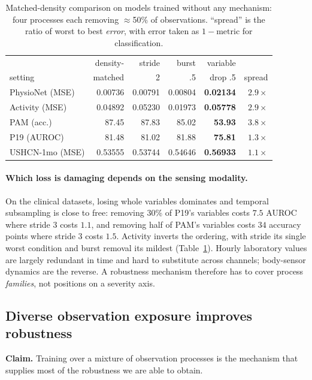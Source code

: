 \begin{table}[t]
\caption{Matched-density comparison on models trained without any mechanism\prelim: four processes each removing
$\approx$50\% of observations. ``spread'' is the ratio of worst to best \emph{error}, with error taken as
$1-\mathrm{metric}$ for classification.}
\label{tab:density}
\small
\begin{tabular}{lrrrrr}
\toprule
 & density- & stride & burst & variable & \\
setting & matched & 2 & .5 & drop .5 & spread \\
\midrule
PhysioNet (MSE) & 0.00736 & 0.00791 & 0.00804 & \textbf{0.02134} & $2.9\times$ \\
Activity (MSE) & 0.04892 & 0.05230 & 0.01973 & \textbf{0.05778} & $2.9\times$ \\
PAM (acc.) & 87.45 & 87.83 & 85.02 & \textbf{53.93} & $3.8\times$ \\
P19 (AUROC) & 81.48 & 81.02 & 81.88 & \textbf{75.81} & $1.3\times$ \\
USHCN-1mo (MSE) & 0.53555 & 0.53744 & 0.54646 & \textbf{0.56933} & $1.1\times$ \\
\bottomrule
\end{tabular}
\end{table}

\paragraph{Which loss is damaging depends on the sensing modality.}
On the clinical datasets, losing whole variables dominates and temporal subsampling is close to free: removing
30\% of P19's variables costs $7.5$ AUROC where stride $3$ costs $1.1$, and removing half of PAM's variables costs
$34$ accuracy points where stride $3$ costs $1.5$. Activity inverts the ordering, with stride its single worst
condition and burst removal its mildest (Table~\ref{tab:density}). Hourly laboratory values are largely redundant
in time and hard to substitute across channels; body-sensor dynamics are the reverse. A robustness mechanism
therefore has to cover process \emph{families}, not positions on a severity axis.

\subsection{Diverse observation exposure improves robustness}
\label{sec:q-aug}

\textbf{Claim.} Training over a mixture of observation processes is the mechanism that supplies most of the
robustness we are able to obtain.

